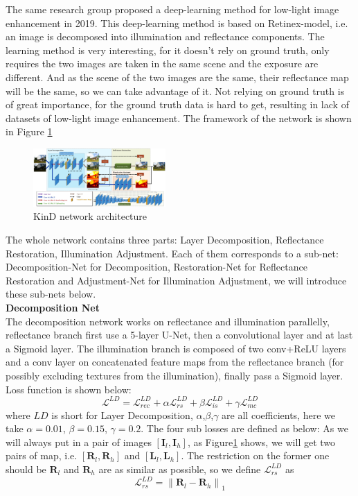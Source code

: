 \documentclass[10pt,twocolumn,letterpaper]{article}
\begin{document}
 The same research group proposed a deep-learning method for low-light image enhancement\cite{zhang2019kindling} in 2019. This deep-learning method is based on Retinex-model, i.e. an image is decomposed into illumination and reflectance components. The learning method is very interesting, for it doesn't rely on ground truth, only requires the two images are taken in the same scene and the exposure are different. And as the scene of the two images are the same, their reflectance map will be the same, so we can take advantage of it. Not relying on ground truth is of great importance, for the ground truth data is hard to get, resulting in lack of datasets of low-light image enhancement. The framework of the network is shown in Figure \ref{fig:kindle}
\begin{figure}[t]
    \centering
    \includegraphics[width=0.45\textwidth]{latex/Kindle.png}
    \caption{KinD network architecture \cite{zhang2019kindling}}
    \label{fig:kindle}
\end{figure}

The whole network contains three parts: Layer Decomposition, Reflectance Restoration, Illumination Adjustment. Each of them corresponds to a sub-net: Decomposition-Net for Decomposition, Restoration-Net for Reflectance Restoration and Adjustment-Net for Illumination Adjustment, we will introduce these sub-nets below. \\
\textbf{Decomposition Net} \\
The decomposition network works on reflectance and illumination parallelly,
reflectance branch first use a 5-layer U-Net, then a convolutional layer and at last a Sigmoid layer. The illumination branch is composed of two conv+ReLU layers and a conv layer on concatenated feature maps from the reflectance branch (for possibly excluding textures from the illumination), finally pass a Sigmoid layer.
Loss function is shown below:
\begin{equation}
    \mathcal{L}^{LD} = \mathcal{L}^{LD}_{rec}+\alpha \mathcal{L}^{LD}_{rs}+\beta \mathcal{L}^{LD}_{is}+ \gamma \mathcal{L}^{LD}_{mc}
\end{equation}
where $LD$ is short for Layer Decomposition, $\alpha$,$\beta$,$\gamma$ are all coefficients, here we take $\alpha = 0.01$, $\beta = 0.15$, $\gamma = 0.2 $. The four sub losses are defined as below:
As we will always put in a pair of images $[\mathbf{I}_l, \mathbf{I}_h]$, as Figure\ref{fig:kindle} shows, we will get two pairs of map, i.e. $[\mathbf{R}_l,\mathbf{R}_h]$ and $[\mathbf{L}_l,\mathbf{L}_h]$. The restriction on the former one should be $\mathbf{R}_l$ and $\mathbf{R}_h$  are as similar as possible, so we define $\mathcal{L}_{rs}^{LD}$ as
\begin{equation}
    \mathcal{L}_{rs}^{LD} = \left\|\mathbf{R}_l - \mathbf{R}_h\right\|_1
\end{equation}
\end{document}
